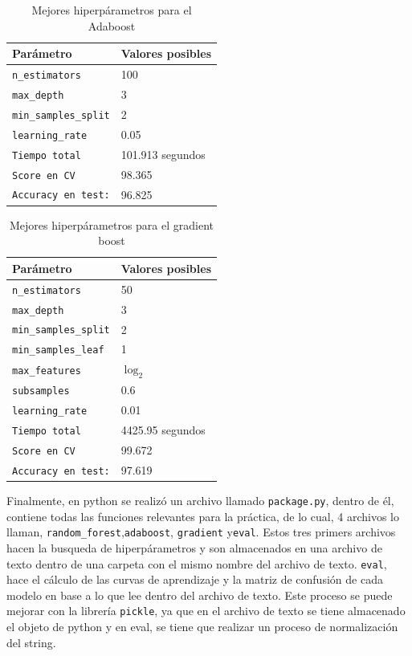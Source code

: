 \documentclass[conference]{IEEEtran}
\begin{document}
\begin{table}[ht]
    \centering
    \begin{tabular}{|l|l|}
    \hline
    \textbf{Parámetro} & \textbf{Valores posibles}  \\ \hline
    \texttt{n\_estimators} & 100  \\ \hline
    \texttt{max\_depth} & 3  \\ \hline
    \texttt{min\_samples\_split} & 2  \\ \hline

    \texttt{learning\_rate} & 0.05 \\ \hline
    \texttt{Tiempo total} & 101.913 segundos \\ \hline
    \texttt{Score en CV} & 98.365 \\ \hline
    \texttt{Accuracy en test:} &96.825 \\ \hline
    \end{tabular}
    \caption{Mejores hiperpárametros para el Adaboost}
    \label{tab:Tabla_5}
\end{table}
\begin{table}[ht]
    \centering
    \begin{tabular}{|l|l|}
    \hline
    \textbf{Parámetro} & \textbf{Valores posibles}  \\ \hline
    \texttt{n\_estimators} & 50  \\ \hline
    \texttt{max\_depth} & 3  \\ \hline
    \texttt{min\_samples\_split} & 2  \\ \hline
    \texttt{min\_samples\_leaf} & 1  \\ \hline
    \texttt{max\_features} & $\log_2$  \\ \hline
    \texttt{subsamples} & 0.6  \\ \hline
    \texttt{learning\_rate} & 0.01 \\ \hline
    \texttt{Tiempo total} & 4425.95 segundos \\ \hline
    \texttt{Score en CV} & 99.672 \\ \hline
    \texttt{Accuracy en test:} &97.619 \\ \hline
    \end{tabular}
    \caption{Mejores hiperpárametros para el gradient boost}
    \label{tab:Tabla_5}
\end{table}
Finalmente, en python se realizó un archivo llamado \texttt{package.py}, dentro de él, contiene todas las funciones relevantes para la práctica, de lo cual, 4 archivos lo llaman, \texttt{random\_forest},\texttt{adaboost}, \texttt{gradient} y\texttt{eval}. Estos tres primers archivos hacen la busqueda de hiperpárametros y son almacenados en una archivo de texto dentro de una carpeta con el mismo nombre del archivo de texto. \texttt{eval}, hace el cálculo de las curvas de aprendizaje y la matriz de confusión de cada modelo en base a lo que lee dentro del archivo de texto. Este proceso se puede mejorar con la librería \texttt{pickle}, ya que en el archivo de texto se tiene almacenado el objeto de python y en eval, se tiene que realizar un proceso de normalización del string.
\end{document}
